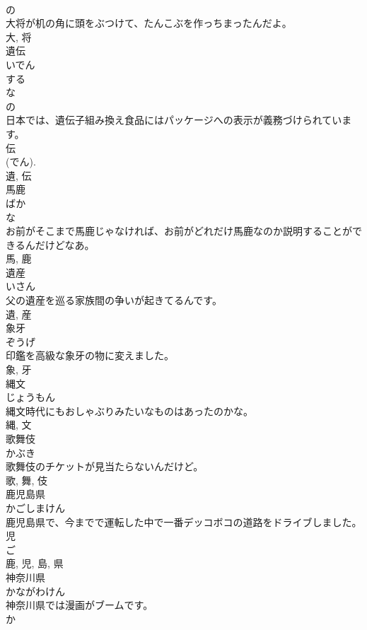 \documentclass[8pt]{extreport}
\begin{document}
\begin{CJK}{UTF8}{min}
\\	の 
\\	大将が机の角に頭をぶつけて、たんこぶを作っちまったんだよ。	
\\	大, 将	
\\	遺伝	
\\	いでん	
\\	する 
\\	な 
\\	の 
\\	日本では、遺伝子組み換え食品にはパッケージへの表示が義務づけられています。	
\\	伝 
\\	(でん). 
\\	遺, 伝	
\\	馬鹿	
\\	ばか	
\\	な 
\\	お前がそこまで馬鹿じゃなければ、お前がどれだけ馬鹿なのか説明することができるんだけどなあ。	
\\	馬, 鹿	
\\	遺産	
\\	いさん	
\\	父の遺産を巡る家族間の争いが起きてるんです。	
\\	遺, 産	
\\	象牙	
\\	ぞうげ	
\\	印鑑を高級な象牙の物に変えました。	
\\	象, 牙	
\\	縄文	
\\	じょうもん	
\\	縄文時代にもおしゃぶりみたいなものはあったのかな。	
\\	縄, 文	
\\	歌舞伎	
\\	かぶき	
\\	歌舞伎のチケットが見当たらないんだけど。	
\\	歌, 舞, 伎	
\\	鹿児島県	
\\	かごしまけん	
\\	鹿児島県で、今までで運転した中で一番デッコボコの道路をドライブしました。	
\\	児 
\\	ご 
\\	鹿, 児, 島, 県	
\\	神奈川県	
\\	かながわけん	
\\	神奈川県では漫画がブームです。	
\\	か 

\end{CJK}
\end{document}
